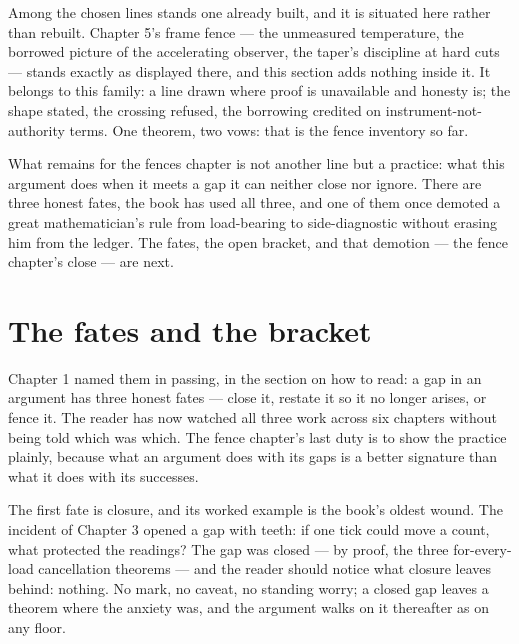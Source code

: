 Among the chosen lines stands one already built, and it is situated here rather
than rebuilt. Chapter 5's frame fence --- the unmeasured temperature, the
borrowed picture of the accelerating observer, the taper's discipline at hard
cuts --- stands exactly as displayed there, and this section adds nothing inside
it. It belongs to this family: a line drawn where proof is unavailable and
honesty is; the shape stated, the crossing refused, the borrowing credited on
instrument-not-authority terms. One theorem, two vows: that is the fence
inventory so far.

What remains for the fences chapter is not another line but a practice: what
this argument does when it meets a gap it can neither close nor ignore. There
are three honest fates, the book has used all three, and one of them once
demoted a great mathematician's rule from load-bearing to side-diagnostic
without erasing him from the ledger. The fates, the open bracket, and that
demotion --- the fence chapter's close --- are next.

\section{The fates and the bracket}

Chapter 1 named them in passing, in the section on how to read: a gap in an argument
has three honest fates --- close it, restate it so it no longer arises, or fence it.
The reader has now watched all three work across six chapters without being told
which was which. The fence chapter's last duty is to show the practice plainly,
because what an argument does with its gaps is a better signature than what it does
with its successes.

The first fate is closure, and its worked example is the book's oldest wound. The
incident of Chapter 3 opened a gap with teeth: if one tick could move a count, what
protected the readings? The gap was closed --- by proof, the three for-every-load
cancellation theorems --- and the reader should notice what closure leaves behind:
nothing. No mark, no caveat, no standing worry; a closed gap leaves a theorem where
the anxiety was, and the argument walks on it thereafter as on any floor.

